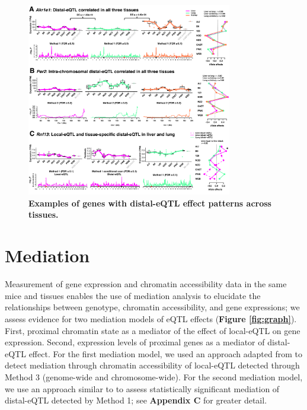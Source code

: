 \begin{figure}[h]
\renewcommand{\familydefault}{\sfdefault}\normalfont
\centering
\includegraphics[width=0.8\textwidth, trim={0in 0in 0in 0in}, clip]{figs/correlated_distal_eqtl.pdf}
\caption{\textbf{Examples of genes with distal-eQTL effect patterns across tissues.}\label{fig:correlated_distal_eqtl}}
\end{figure}

\section{Mediation}

Measurement of gene expression and chromatin accessibility data in the same mice and tissues enables the use of mediation analysis to elucidate the relationships between genotype, chromatin accessibility, and gene expressions; we assess evidence for two mediation models of eQTL effects (\textbf{Figure \ref{fig:graph}}). First, proximal chromatin state as a mediator of the effect of local-eQTL on gene expression. Second, expression levels of proximal genes as a mediator of distal-eQTL effect. For the first mediation model, we used an approach adapted from \cite{Chick2016} to detect mediation through chromatin accessibility of local-eQTL detected through Method 3 (genome-wide and chromosome-wide). For the second mediation model, we use an approach similar to \cite{Keller2018} to assess statistically significant mediation of distal-eQTL detected by Method 1; see \textbf{Appendix C} for greater detail.  

